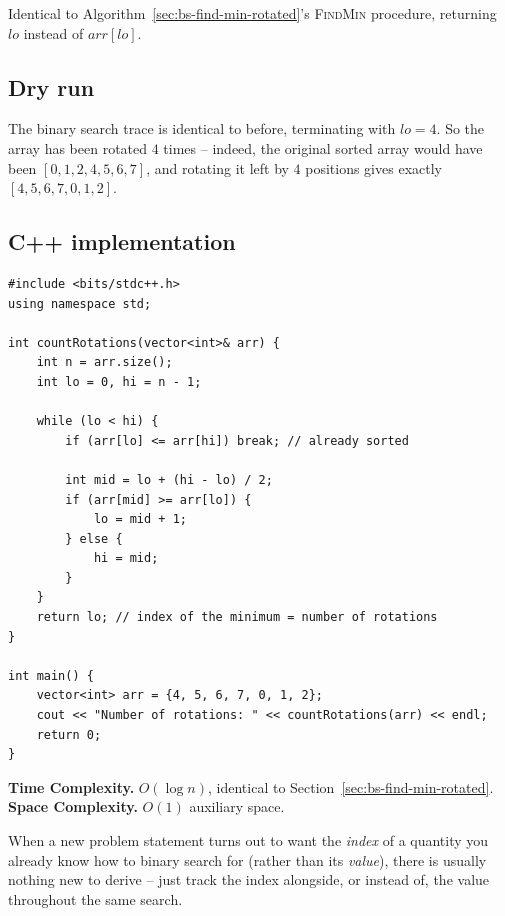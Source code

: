 Identical to Algorithm~\ref{sec:bs-find-min-rotated}'s \textsc{FindMin}
procedure, returning $\textit{lo}$ instead of $\textit{arr}[\textit{lo}]$.

\subsection*{Dry run}


The binary search trace is identical to before, terminating with
$\textit{lo} = 4$. So the array has been rotated $4$ times -- indeed, the
original sorted array would have been $[0,1,2,4,5,6,7]$, and rotating it
left by $4$ positions gives exactly $[4,5,6,7,0,1,2]$.

\subsection*{C++ implementation}

\begin{lstlisting}
#include <bits/stdc++.h>
using namespace std;

int countRotations(vector<int>& arr) {
    int n = arr.size();
    int lo = 0, hi = n - 1;

    while (lo < hi) {
        if (arr[lo] <= arr[hi]) break; // already sorted

        int mid = lo + (hi - lo) / 2;
        if (arr[mid] >= arr[lo]) {
            lo = mid + 1;
        } else {
            hi = mid;
        }
    }
    return lo; // index of the minimum = number of rotations
}

int main() {
    vector<int> arr = {4, 5, 6, 7, 0, 1, 2};
    cout << "Number of rotations: " << countRotations(arr) << endl;
    return 0;
}
\end{lstlisting}

\begin{complexitybox}
\textbf{Time Complexity.} $O(\log n)$, identical to
Section~\ref{sec:bs-find-min-rotated}.
\textbf{Space Complexity.} $O(1)$ auxiliary space.
\end{complexitybox}

\begin{takeawaybox}
When a new problem statement turns out to want the \emph{index} of a
quantity you already know how to binary search for (rather than its
\emph{value}), there is usually nothing new to derive -- just track the
index alongside, or instead of, the value throughout the same search.
\end{takeawaybox}
